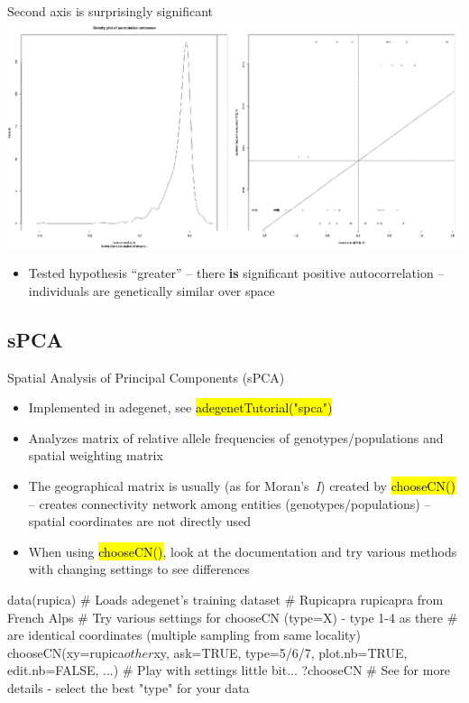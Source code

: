 \documentclass[compress, ucs, xelatex, 11pt, xcolor=svgnames,
  hyperref={
    bookmarks=true,
    unicode=true,
    colorlinks=true,
    pdftitle={Molecular data in R},
    plainpages=false,
    pdfauthor={Vojtech Zeisek},
    pdfsubject={Course about phylogeny and evolution in R},
    pdfcreator={XeLaTeX},
    pdfkeywords={R, evolution, phylogeny, molecular data},
    linkcolor=Tomato,
    anchorcolor=SaddleBrown,
    citecolor=Goldenrod,
    filecolor=DarkMagenta,
    menucolor=Sienna,
    urlcolor=DarkTurquoise,
    pdftex},
  url={hyphens, lowtilde} %
  ]{beamer}
\renewcommand{\texttt}[1]{\hl{\ttfamily #1}}
\begin{document}
\begin{frame}{Second axis is surprisingly significant}
  \includegraphics[width=\textwidth]{moran2.png}
  \begin{itemize}
    \item Tested hypothesis ``greater'' -- there \textbf{is} significant positive autocorrelation -- individuals are genetically similar over space
  \end{itemize}
\end{frame}

\subsection{sPCA}

\begin{frame}[fragile]{Spatial Analysis of Principal Components (sPCA)}
\begin{itemize}
 \item Implemented in adegenet, see \texttt{adegenetTutorial("spca")}
 \item Analyzes matrix of relative allele frequencies of genotypes/populations and spatial weighting matrix
 \item The geographical matrix is usually (as for Moran's~\textit{I}) created by \texttt{chooseCN()} -- creates connectivity network among entities (genotypes/populations) -- spatial coordinates are not directly used
 \item When using \texttt{chooseCN()}, look at the documentation and try various methods with changing settings to see differences
\end{itemize}
  \begin{spluscode}
    data(rupica) # Loads adegenet's training dataset
                 # Rupicapra rupicapra from French Alps
    # Try various settings for chooseCN (type=X) - type 1-4 as there
    # are identical coordinates (multiple sampling from same locality)
    chooseCN(xy=rupica$other$xy, ask=TRUE, type=5/6/7, plot.nb=TRUE,
      edit.nb=FALSE, ...) # Play with settings little bit...
    ?chooseCN # See for more details - select the best "type" for your data
  \end{spluscode}
\end{frame}
\end{document}
